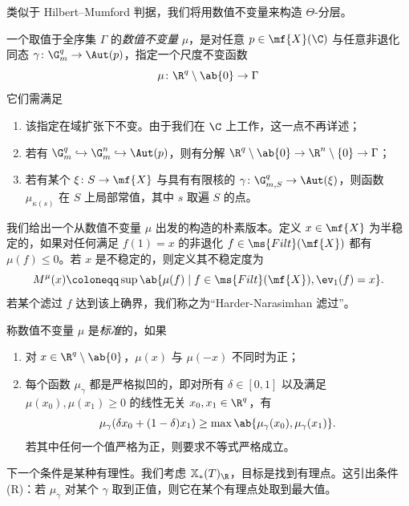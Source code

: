 类似于 Hilbert--Mumford 判据，我们将用数值不变量来构造 \(\Theta\)-分层。
\begin{defn}
    一个取值于全序集 \(\Gamma\) 的\textit{数值不变量} \(\mu\)，是对任意 \(p \in \mf{X}(\C)\) 与任意非退化同态 \(\gamma \colon \G_m^q \to \Aut(p)\)，指定一个尺度不变函数
    \[ \mu \colon \R^q \setminus \ab\{0\} \to \Gamma \]
    它们需满足
    \begin{enumerate}
        \item 该指定在域扩张下不变。由于我们在 \(\C\) 上工作，这一点不再详述；
        \item 若有 \(\G_m^q \hookrightarrow \G_m^n \hookrightarrow \Aut(p)\)，则有分解 \(\R^q \setminus \ab\{0\} \to \R^n \setminus \{0\} \to \Gamma\)；
        \item 若有某个 \(\xi \colon S \to \mf{X}\) 与具有有限核的 \(\gamma \colon \G_{m, S}^q \to \Aut(\xi)\)，则函数 \(\mu_{\kappa(s)}\) 在 \(S\) 上局部常值，其中 \(s\) 取遍 \(S\) 的点。
    \end{enumerate}
\end{defn}

我们给出一个从数值不变量 \(\mu\) 出发的构造的朴素版本。定义 \(x \in \mf{X}\) 为半稳定的，如果对任何满足 \(f(1) = x\) 的非退化 \(f \in \ms{Filt}(\mf{X})\) 都有 \(\mu(f) \leq 0\)。若 \(x\) 是不稳定的，则定义其不稳定度为
\[ M^{\mu}(x) \coloneqq \sup \ab\{ \mu(f) \mid f \in \ms{Filt}(\mf{X}), \ev_1(f) = x\}. \]
若某个滤过 \(f\) 达到该上确界，我们称之为“Harder-Narasimhan 滤过”。

\begin{defn}
    称数值不变量 \(\mu\) 是\textit{标准}的，如果
    \begin{enumerate}
        \item 对 \(x \in \R^q \setminus \ab\{0\}\)，\(\mu(x)\) 与 \(\mu(-x)\) 不同时为正；
        \item 每个函数 \(\mu_{\gamma}\) 都是严格拟凹的，即对所有 \(\delta \in [0,1]\) 以及满足 \(\mu(x_0), \mu(x_1) \geq 0\) 的线性无关 \(x_0, x_1 \in \R^q\)，有 
            \[\mu_{\gamma}(\delta x_0 + (1-\delta)x_1) \geq \max\ab\{\mu_{\gamma}(x_0), \mu_{\gamma}(x_1)\}.\] 若其中任何一个值严格为正，则要求不等式严格成立。
    \end{enumerate}
\end{defn}

下一个条件是某种有理性。我们考虑 \(\mathbb{X}_*(T)_{\R}\)，目标是找到有理点。这引出条件 (R)：若 \(\mu_{\gamma}\) 对某个 \(\gamma\) 取到正值，则它在某个有理点处取到最大值。

